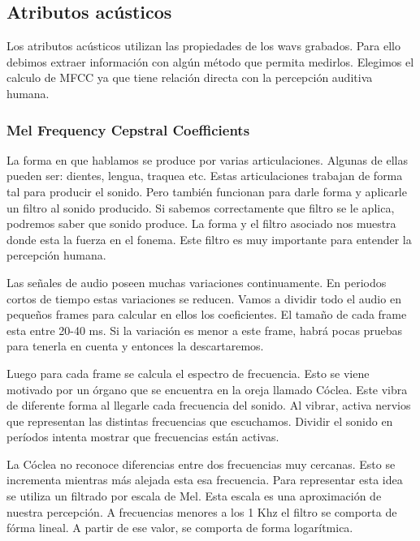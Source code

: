 \documentclass[11pt,a4paper,twoside]{tesis}
\begin{document}
\subsection{Atributos acústicos}

Los atributos acústicos utilizan las propiedades de los wavs grabados. Para ello debimos extraer información con algún método que permita medirlos. Elegimos el calculo de MFCC ya que tiene relación directa con la percepción auditiva humana. 


\subsubsection{Mel Frequency Cepstral Coefficients}


La forma en que hablamos se produce por varias articulaciones. Algunas de ellas pueden ser: dientes, lengua, traquea etc. Estas articulaciones trabajan de forma tal para producir el sonido. Pero también funcionan para darle forma y aplicarle un filtro al sonido producido. Si sabemos correctamente que filtro se le aplica, podremos saber que sonido produce. La forma y el filtro asociado nos muestra donde esta la fuerza en el fonema. Este filtro es muy importante para entender la percepción humana.

Las señales de audio poseen muchas variaciones continuamente. En periodos cortos de tiempo estas variaciones se reducen. Vamos a dividir todo el audio en pequeños frames para calcular en ellos los coeficientes. El tamaño de cada frame esta entre 20-40 ms. Si la variación es menor a este frame, habrá pocas pruebas para tenerla en cuenta y entonces la descartaremos.

Luego para cada frame se calcula el espectro de frecuencia. Esto se viene motivado por un órgano que se encuentra en la oreja llamado Cóclea. Este vibra de diferente forma al llegarle cada frecuencia del sonido. Al vibrar, activa nervios que representan las distintas frecuencias que escuchamos. Dividir el sonido en períodos intenta mostrar que frecuencias están activas.

La Cóclea no reconoce diferencias entre dos frecuencias muy cercanas. Esto se incrementa mientras más alejada esta esa frecuencia. Para representar esta idea se utiliza un filtrado por escala de Mel. Esta escala es una aproximación de nuestra percepción. A frecuencias menores a los 1 Khz el filtro se comporta de fórma lineal. A partir de ese valor, se comporta de forma logarítmica. 
\end{document}
